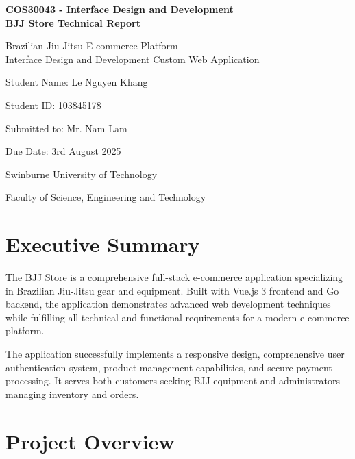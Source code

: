 \documentclass[12pt,a4paper]{article}
\begin{document}
\begin{titlepage}
\centering
\vspace*{2cm}

{\huge\bfseries COS30043 - Interface Design and Development\\BJJ Store Technical Report\par}
\vspace{2cm}

{\Large Brazilian Jiu-Jitsu E-commerce Platform\\Interface Design and Development Custom Web Application\par}
\vspace{3cm}

{\large Student Name: Le Nguyen Khang\par}
{\large Student ID: 103845178\par}
\vspace{2cm}

{\large Submitted to: Mr. Nam Lam\par}
{\large Due Date: 3rd August 2025\par}
\vspace{3cm}

{\large Swinburne University of Technology\par}
{\large Faculty of Science, Engineering and Technology\par}
\vfill

\end{titlepage}

\newpage
\tableofcontents

\newpage

\section{Executive Summary}

The BJJ Store is a comprehensive full-stack e-commerce application specializing in Brazilian Jiu-Jitsu gear and equipment. Built with Vue.js 3 frontend and Go backend, the application demonstrates advanced web development techniques while fulfilling all technical and functional requirements for a modern e-commerce platform.

The application successfully implements a responsive design, comprehensive user authentication system, product management capabilities, and secure payment processing. It serves both customers seeking BJJ equipment and administrators managing inventory and orders.

\section{Project Overview}
\end{document}
